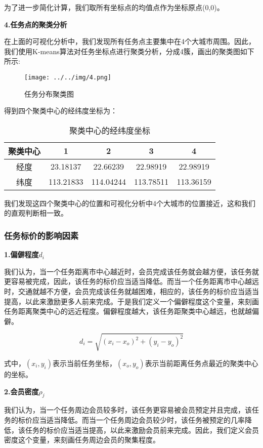 \documentclass[withoutpreface,bwprint]{cumcmthesis} %
\begin{document}
为了进一步简化计算，我们取所有坐标点的均值点作为坐标原点(0,0)。

\textbf{4.任务点的聚类分析}

在上面的可视化分析中，我们发现所有任务点主要集中在4个大城市周围。因此，我们使用K-means算法对任务坐标点进行聚类分析，分成4簇，画出的聚类图如下所示:

\begin{figure}[H]
	\small
	\centering
	\texttt{[image: ../../img/4.png]}
	\caption{任务分布聚类图} 
\end{figure}

得到四个聚类中心的经纬度坐标为：


\begin{table}[H]
	\centering
	\caption{聚类中心的经纬度坐标}
	\begin{tabular}{|c|c|c|c|c|}
		\hline
		聚类中心 & 1         & 2         & 3         & 4         \\ \hline
		经度   & 23.18137  & 22.66239  & 22.98919  & 22.98919  \\ \hline
		纬度   & 113.21833 & 114.04244 & 113.78511 & 113.36159 \\ \hline
	\end{tabular}
\end{table}


我们发现这四个聚类中心的位置和可视化分析中4个大城市的位置接近，这和我们的直观判断相一致。

\subsubsection{任务标价的影响因素}
\textbf{1.偏僻程度${d_i}$}

我们认为，当一个任务距离市中心越近时，会员完成该任务就会越方便，该任务就更容易被完成，因此，该任务的标价应当适当降低。而当一个任务距离市中心越远时，交通就越不方便，会员完成该任务就越困难，相应的，该任务的标价应当适当提高，以此来激励更多人前来完成。于是我们定义一个偏僻程度这个变量，来刻画任务距离聚类中心的远近程度。偏僻程度越大，该任务距聚类中心越远，也就越偏僻。

\begin{equation}
{d_i} = \sqrt {{{({x_i} - {x_o})}^2} + {{({y_i} - {y_o})}^2}} 
\end{equation}

式中，$({x_i} ,{y_i})$表示当前任务坐标，$({x_o} ,{y_o})$表示当前距离任务点最近的聚类中心的坐标。

\textbf{2.会员密度${\rho_j}$}

我们认为，当一个任务周边会员较多时，该任务更容易被会员预定并且完成，该任务的标价应当适当降低。而当一个任务周边会员较少时，该任务被预定的几率降低，该任务的标价应当适当提高，以此来激励会员前来完成。因此，我们定义会员密度这个变量，来刻画任务周边会员的聚集程度。
\end{document}

